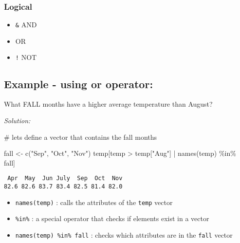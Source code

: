 \documentclass[
  letterpaper,
  DIV=11,
  numbers=noendperiod]{scrreprt}
\newenvironment{Shaded}{\begin{snugshade}}{\end{snugshade}}
\newcommand{\CommentTok}[1]{\textcolor[rgb]{0.37,0.37,0.37}{#1}}
\newcommand{\FunctionTok}[1]{\textcolor[rgb]{0.28,0.35,0.67}{#1}}
\newcommand{\NormalTok}[1]{\textcolor[rgb]{0.00,0.23,0.31}{#1}}
\newcommand{\OtherTok}[1]{\textcolor[rgb]{0.00,0.23,0.31}{#1}}
\newcommand{\SpecialCharTok}[1]{\textcolor[rgb]{0.37,0.37,0.37}{#1}}
\newcommand{\StringTok}[1]{\textcolor[rgb]{0.13,0.47,0.30}{#1}}
\providecommand{\tightlist}{%
  \setlength{\itemsep}{0pt}\setlength{\parskip}{0pt}}\usepackage{longtable,booktabs,array}
\begin{document}
\subsubsection*{Logical}\label{logical}

\begin{itemize}
\tightlist
\item
  \texttt{\&} AND
\item
  \texttt{\textbar{}} OR
\item
  \texttt{!} NOT
\end{itemize}

\subsection*{Example - using or
operator:}\label{example---using-or-operator}

What FALL months have a higher average temperature than August?

\emph{Solution:}

\begin{Shaded}
\begin{Highlighting}[]
\CommentTok{\# let\textquotesingle{}s define a vector that contains the fall months }

\NormalTok{fall }\OtherTok{\textless{}{-}} \FunctionTok{c}\NormalTok{(}\StringTok{"Sep"}\NormalTok{, }\StringTok{"Oct"}\NormalTok{, }\StringTok{"Nov"}\NormalTok{)}
\NormalTok{temp[temp }\SpecialCharTok{\textgreater{}}\NormalTok{ temp[}\StringTok{"Aug"}\NormalTok{] }\SpecialCharTok{|} \FunctionTok{names}\NormalTok{(temp) }\SpecialCharTok{\%in\%}\NormalTok{ fall]}
\end{Highlighting}
\end{Shaded}

\begin{verbatim}
 Apr  May  Jun July  Sep  Oct  Nov 
82.6 82.6 83.7 83.4 82.5 81.4 82.0 
\end{verbatim}

\begin{itemize}
\item
  \texttt{names(temp)} : calls the attributes of the \texttt{temp}
  vector
\item
  \texttt{\%in\%} : a special operator that checks if elements exist in
  a vector
\item
  \texttt{names(temp)\ \%in\%\ fall} : checks which attributes are in
  the \texttt{fall} vector
\end{itemize}
\end{document}
